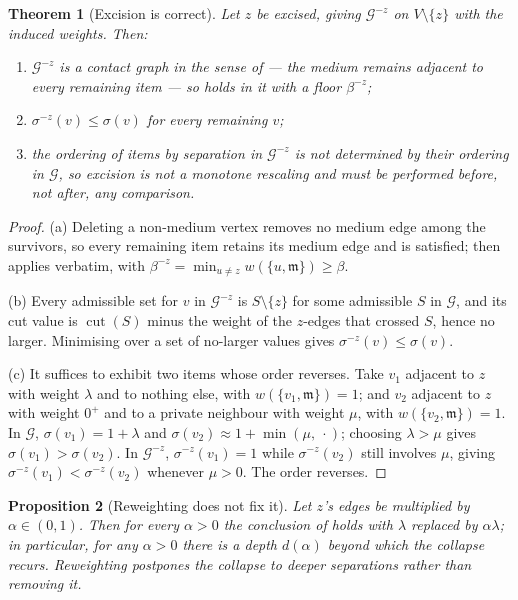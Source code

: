 \documentclass[11pt,a4paper]{article}
\newtheorem{theorem}{Theorem}[section]
\newtheorem{proposition}[theorem]{Proposition}
\theoremstyle{definition}
\theoremstyle{remark}
\newcommand{\Gph}{\mathcal{G}}
\newcommand{\wt}{w}
\newcommand{\med}{\mathfrak{m}}
\newcommand{\flo}{\beta}
\newcommand{\cut}{\operatorname{cut}}
\newcommand{\sep}{\sigma}
\begin{document}
\begin{theorem}[Excision is correct]\label{thm:excision}
Let $z$ be excised, giving $\Gph^{-z}$ on $V \setminus \{z\}$ with the
induced weights. Then:
\begin{enumerate}[label=(\alph*)]
\item $\Gph^{-z}$ is a contact graph in the sense of
 --- the medium remains adjacent to every remaining
item --- so  holds in it with a floor $\flo^{-z}$;
\item $\sep^{-z}(v) \leq \sep(v)$ for every remaining $v$;
\item the ordering of items by separation in $\Gph^{-z}$ is not
determined by their ordering in $\Gph$, so excision is not a monotone
rescaling and must be performed before, not after, any comparison.
\end{enumerate}
\end{theorem}

\begin{proof}
(a) Deleting a non-medium vertex removes no medium edge among the
survivors, so every remaining item retains its medium edge and
 is satisfied;  then applies verbatim,
with $\flo^{-z} = \min_{u \neq z} \wt(\{u,\med\}) \geq \flo$.

(b) Every admissible set for $v$ in $\Gph^{-z}$ is $S \setminus \{z\}$
for some admissible $S$ in $\Gph$, and its cut value is $\cut(S)$ minus
the weight of the $z$-edges that crossed $S$, hence no larger. Minimising
over a set of no-larger values gives $\sep^{-z}(v) \leq \sep(v)$.

(c) It suffices to exhibit two items whose order reverses. Take $v_1$
adjacent to $z$ with weight $\lambda$ and to nothing else, with
$\wt(\{v_1,\med\}) = 1$; and $v_2$ adjacent to $z$ with weight $0^{+}$
and to a private neighbour with weight $\mu$, with
$\wt(\{v_2,\med\}) = 1$. In $\Gph$, $\sep(v_1) = 1+\lambda$ and
$\sep(v_2) \approx 1 + \min(\mu,\ \cdot)$; choosing
$\lambda > \mu$ gives $\sep(v_1) > \sep(v_2)$. In $\Gph^{-z}$,
$\sep^{-z}(v_1) = 1$ while $\sep^{-z}(v_2)$ still involves $\mu$, giving
$\sep^{-z}(v_1) < \sep^{-z}(v_2)$ whenever $\mu > 0$. The order reverses.
\end{proof}

\begin{proposition}[Reweighting does not fix it]\label{prop:reweight-fails}
Let $z$'s edges be multiplied by $\alpha \in (0,1)$. Then for every
$\alpha > 0$ the conclusion of  holds with $\lambda$
replaced by $\alpha\lambda$; in particular, for any $\alpha>0$ there is
a depth $d(\alpha)$ beyond which the collapse recurs. Reweighting
postpones the collapse to deeper separations rather than removing it.
\end{proposition}
\end{document}
